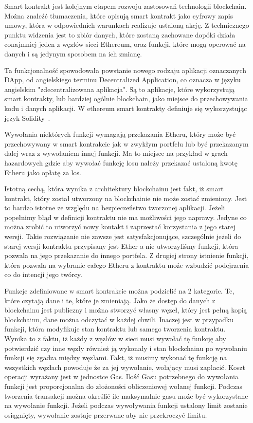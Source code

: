 \documentclass[]{llncs}
\renewcommand{\cite}[1]{~\oldcite{#1}}
\begin{document}
  Smart kontrakt jest kolejnym etapem rozwoju zastosowań technologii blockchain.
  Można znaleźć tłumaczenia, które opisują smart kontrakt jako cyfrowy zapis
  umowy, która w odpowiednich warunkach realizuje ustaloną akcję. Z technicznego
  punktu widzenia jest to zbiór danych, które zostaną zachowane dopóki działa
  conajmniej jeden z węzłów sieci Ethereum, oraz funkcji, które mogą operować na
  danych i są jedynym sposobem na ich zmianę.

  Ta funkcjonalność spowodowała powstanie nowego rodzaju aplikacji oznaczanych
  DApp, od angielskiego terminu Decentralized Application, co oznacza w języku
  angielskim "zdecentralizowana aplikacja". Są to aplikacje, które wykorzystują
  smart kontrakty, lub bardziej ogólnie blockchain, jako miejsce do
  przechowywania kodu i danych aplikacji. W ethereum smart kontrakty definiuje
  się wykorzystując język Solidity\cite{solidity}.

  Wywołania niektórych funkcji wymagają przekazania Etheru, który może być
  przechowywany w smart kontrakcie jak w zwykłym portfelu lub być przekazanym
  dalej wraz z wywołaniem innej funkcji. Ma to miejsce na przykład w grach
  hazardowych gdzie aby wywołać funkcję losu należy przekazać ustaloną kwotę
  Etheru jako opłatę za los.

  Istotną cechą, która wynika z architektury blockchainu jest fakt, iż smart
  kontrakt, który został utworzony na blockchainie nie może zostać zmieniony.
  Jest to bardzo istotne ze względu na bezpieczeństwo tworzonej aplikacji.
  Jeżeli popełnimy błąd w definicji kontraktu nie ma możliwości jego naprawy.
  Jedyne co można zrobić to utworzyć nowy kontakt i zaprzestać korzystania z
  jego starej wersji. Takie rozwiązanie nie zawsze jest satysfakcjonujące,
  szczególnie jeżeli do starej wersji kontraktu przypisany jest Ether a nie
  utworzyliśmy funkcji, która pozwala na jego przekazanie do innego portfela. Z
  drugiej strony istnienie funkcji, która pozwala na wybranie całego Etheru z
  kontraktu może wzbudzić podejrzenia co do intencji jego twórcy.

  Funkcje zdefiniowane w smart kontrakcie można podzielić na 2 kategorie. Te,
  które czytają dane i te, które je zmieniają. Jako że dostęp do danych z
  blockchainu jest publiczny i można stworzyć własny węzeł, który jest pełną
  kopią blockchainu, dane można odczytać w każdej chwili. Inaczej jest w
  przypadku funkcji, która modyfikuje stan kontraktu lub samego tworzenia
  kontraktu. Wynika to z faktu, iż każdy z węzłów w sieci musi wywołać tę
  funkcję aby potwierdzić czy inne węzły również ją wykonały i stan blockchainu
  po wywołaniu funkcji się zgadza między węzłami. Fakt, iż musimy wykonać tę
  funkcję na wszystkich węzłach powoduje że za jej wywołanie, wołający musi
  zapłacić. Koszt operacji wyrażany jest w jednostce Gas. Ilość Gasu potrzebnego
  do wywołania funkcji jest proporcjonalna do złożoności obliczeniowej wołanej
  funkcji. Podczas tworzenia transakcji można określić ile maksymalnie gasu może
  być wykorzystane na wywołanie funkcji. Jeżeli podczas wywoływania funkcji
  ustalony limit zostanie osiągnięty, wywołanie zostaje przerwane aby nie
  przekroczyć limitu.
\end{document}
